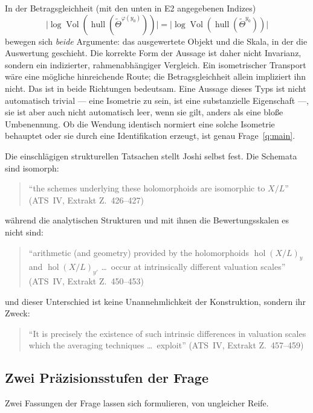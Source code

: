 \documentclass[11pt,a4paper]{article}
\theoremstyle{definition}
\theoremstyle{plain}
\theoremstyle{definition}
\newcommand{\hol}{\operatorname{hol}}
\newcommand{\Vol}{\operatorname{Vol}}
\newcommand{\Thet}{\widetilde{\Theta}}
\newcommand{\anchor}[2]{(#1, Extrakt Z.~#2)}
\begin{document}
In der Betragsgleichheit (mit den unten in E2 angegebenen Indizes)
\[
 \bigl|\log\Vol(\operatorname{hull}(\Thet^{\varphi(y_0)}))\bigr|
 =\bigl|\log\Vol(\operatorname{hull}(\Thet^{y_0}))\bigr|
\]
bewegen sich \emph{beide} Argumente: das ausgewertete Objekt und die Skala, in der
die Auswertung geschieht. Die korrekte Form der Aussage ist daher nicht Invarianz,
sondern ein indizierter, rahmenabhängiger Vergleich. Ein isometrischer Transport
 wäre eine mögliche hinreichende Route; die Betragsgleichheit allein impliziert ihn nicht. Das ist
in beide Richtungen bedeutsam. Eine Aussage dieses Typs ist nicht automatisch
trivial --- eine Isometrie zu sein, ist eine substanzielle Eigenschaft ---, sie ist
aber auch nicht automatisch leer, wenn sie gilt, anders als eine bloße Umbenennung.
Ob die Wendung \glqq identisch normiert\grqq{} eine solche Isometrie behauptet oder
sie durch eine Identifikation erzeugt, ist genau Frage~\ref{q:main}.

Die einschlägigen strukturellen Tatsachen stellt Joshi selbst fest. Die Schemata
sind isomorph:

\begin{quote}\small
``the schemes underlying these holomorphoids are isomorphic to $X/L$''
\hfill\anchor{ATS~IV}{426--427}
\end{quote}

während die analytischen Strukturen und mit ihnen die Bewertungsskalen es nicht
sind:

\begin{quote}\small
``arithmetic (and geometry) provided by the holomorphoids $\hol(X/L)_y$ and
$\hol(X/L)_{y'}$ \ldots\ occur at intrinsically different valuation scales''
\hfill\anchor{ATS~IV}{450--453}
\end{quote}

und dieser Unterschied ist keine Unannehmlichkeit der Konstruktion, sondern ihr
Zweck:

\begin{quote}\small
``It is precisely the existence of such intrinsic differences in valuation scales
which the averaging techniques \ldots\ exploit''
\hfill\anchor{ATS~IV}{457--459}
\end{quote}

\subsection{Zwei Präzisionsstufen der Frage}

Zwei Fassungen der Frage lassen sich formulieren, von ungleicher Reife.
\end{document}
